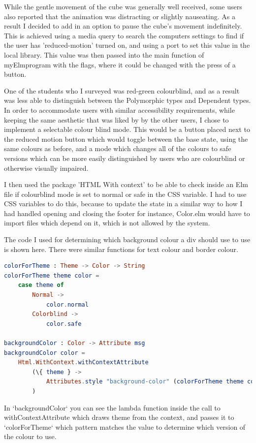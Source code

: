 \documentclass{l4proj}
\begin{document}
While the gentle movement of the cube was generally well received, some users also reported that the animation was distracting or slightly nauseating.  As a result I decided to add in an option to pause the cube's movement indefinitely.  This is achieved using a media query to search the computers settings to find if the user has 'reduced-motion' turned on, and using a port to set this value in the local library.  This value was then passed into the main function of myElmprogram with the flags, where it could be changed with the press of a button.

One of the students who I surveyed was red-green colourblind, and as a result was less able to distinguish between the Polymorphic types and Dependent types.  In order to accommodate users with similar accessibility requirements, while keeping the same aesthetic that was liked by by the other users, I chose to implement a selectable colour blind mode.  This would be a button placed next to the reduced motion button which would toggle between the base state, using the same colours as before, and a mode which changes all of the colours to safe versions which can be more easily distinguished by users who are colourblind or otherwise visually impaired.

I then used the package 'HTML With context' to be able to check inside an Elm file if colourblind mode is set to normal or safe in the CSS variable.  I had to use CSS variables to do this, because to update the state in a similar way to how I had handled opening and closing the footer for instance, Color.elm would have to import files which depend on it, which is not allowed by the system.

The code I used for determining which background colour a div should use to use is shown here.  There were similar functions for text colour and border colour.

\begin{lstlisting}[language = Elm]
colorForTheme : Theme -> Color -> String
colorForTheme theme color =
    case theme of
        Normal ->
            color.normal
        Colorblind ->
            color.safe

backgroundColor : Color -> Attribute msg
backgroundColor color =
    Html.WithContext.withContextAttribute
        (\{ theme } ->
            Attributes.style "background-color" (colorForTheme theme color)
        )
\end{lstlisting}

In `backgroundColor` you can see the lambda function inside the call to withContextAttribute which draws theme from the context, and passes it to `colorForTheme` which pattern matches the value to determine which version of the colour to use.
\end{document}
